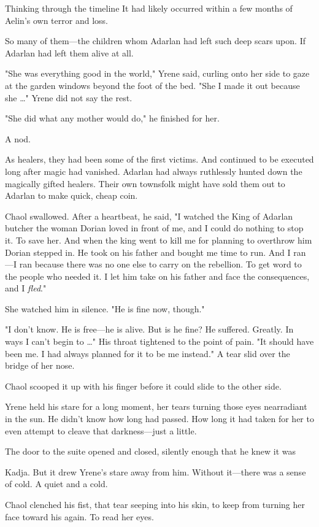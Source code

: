 Thinking through the timeline  It had likely occurred within a few months of Aelin's own terror and loss.

So many of them---the children whom Adarlan had left such deep scars upon. If Adarlan had left them alive at all.

"She was everything good in the world," Yrene said, curling onto her side to gaze at the garden windows beyond the foot of the bed. "She
 I made it out because she \ldots" Yrene did not say the rest.

"She did what any mother would do," he finished for her.

A nod.

As healers, they had been some of the first victims. And continued to be executed long after magic had vanished. Adarlan had always ruthlessly hunted down the magically gifted healers. Their own townsfolk might have sold them out to Adarlan to make quick, cheap coin.

Chaol swallowed. After a heartbeat, he said, "I watched the King of Adarlan butcher the woman Dorian loved in front of me, and I could do nothing to stop it. To save her. And when the king went to kill me for planning to overthrow him  Dorian stepped in. He took on his father and bought me time to run. And I ran ---I ran because 
there was no one else to carry on the rebellion. To get word to the people who needed it. I let him take on his father and face the consequences, and I \emph{fled}."

She watched him in silence. "He is fine now, though."

"I don't know. He is free---he is alive. But is he fine? He suffered. Greatly. In ways I can't begin to \ldots" His throat tightened to the point of pain. "It should have been me. I had always planned for it to be me instead." A tear slid over the bridge of her nose.

Chaol scooped it up with his finger before it could slide to the other side.

Yrene held his stare for a long moment, her tears turning those eyes nearradiant in the sun. He didn't know how long had passed. How long it had taken for her to even attempt to cleave that darkness---just a little.

The door to the suite opened and closed, silently enough that he knew it was

Kadja. But it drew Yrene's stare away from him. Without it---there was a sense of cold. A quiet and a cold.

Chaol clenched his fist, that tear seeping into his skin, to keep from turning her face toward his again. To read her eyes.

